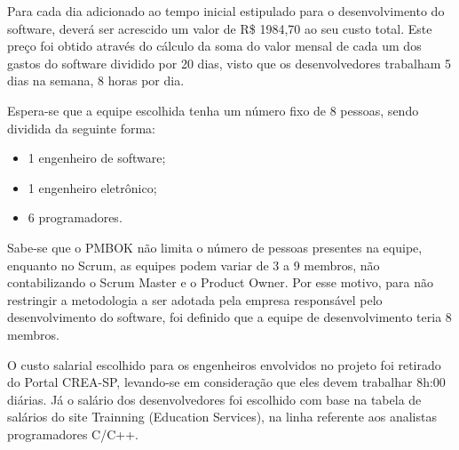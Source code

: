 Para cada dia adicionado ao tempo inicial estipulado para o desenvolvimento do software, deverá ser acrescido um valor de R\$ 1984,70 ao seu custo total. Este preço foi obtido através do cálculo da soma do valor mensal de cada um dos gastos do software dividido por 20 dias, visto que os desenvolvedores trabalham 5 dias na semana, 8 horas por dia.

Espera-se que a equipe escolhida tenha um número fixo de 8 pessoas, sendo dividida da seguinte forma:

\begin{itemize}
\item 1 engenheiro de software;
\item 1 engenheiro eletrônico;
\item 6 programadores.
\end{itemize}

Sabe-se que o PMBOK não limita o número de pessoas presentes na equipe, enquanto no Scrum, as equipes podem variar de 3 a 9 membros, não contabilizando o Scrum Master e o Product Owner. Por esse motivo, para não restringir a metodologia a ser adotada pela empresa responsável pelo desenvolvimento do software, foi definido que a equipe de desenvolvimento teria 8 membros.

O custo salarial escolhido para os engenheiros envolvidos no projeto foi retirado do Portal CREA-SP, levando-se em consideração que eles devem trabalhar 8h:00 diárias. Já o salário dos desenvolvedores foi escolhido com base na tabela de salários do site Trainning (Education Services), na linha referente aos analistas programadores C/C++.
